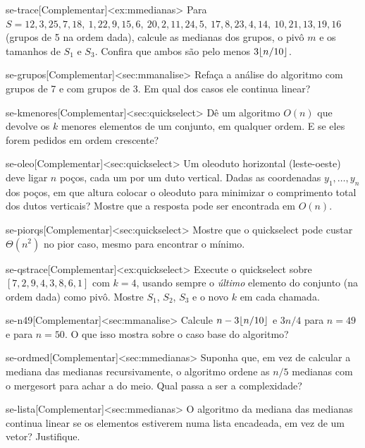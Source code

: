 \excompl
\begin{exercicio}{se-trace}[Complementar]<ex:mmedianas>
Para $S=12,3,25,7,18,\ 1,22,9,15,6,\ 20,2,11,24,5,\ 17,8,23,4,14,\ 10,21,13,19,16$ (grupos de 5 na ordem dada), calcule as medianas dos grupos, o pivô $m$ e os tamanhos de $S_1$ e $S_3$. Confira que ambos são pelo menos $3\lfloor n/10\rfloor$.
\end{exercicio}
\begin{exercicio}{se-grupos}[Complementar]<sec:mmanalise>
Refaça a análise do algoritmo com grupos de 7 e com grupos de 3. Em qual dos casos ele continua linear?
\end{exercicio}
\begin{exercicio}{se-kmenores}[Complementar]<sec:quickselect>
Dê um algoritmo $O(n)$ que devolve os $k$ menores elementos de um conjunto, em qualquer ordem. E se eles forem pedidos em ordem crescente?
\end{exercicio}
\begin{exercicio}{se-oleo}[Complementar]<sec:quickselect>
Um oleoduto horizontal (leste-oeste) deve ligar $n$ poços, cada um por um duto vertical. Dadas as coordenadas $y_1,\dots,y_n$ dos poços, em que altura colocar o oleoduto para minimizar o comprimento total dos dutos verticais? Mostre que a resposta pode ser encontrada em $O(n)$.
\end{exercicio}
\begin{exercicio}{se-piorqs}[Complementar]<sec:quickselect>
Mostre que o quickselect pode custar $\Theta(n^2)$ no pior caso, mesmo para encontrar o mínimo.
\end{exercicio}
\begin{exercicio}{se-qstrace}[Complementar]<ex:quickselect>
Execute o quickselect sobre $[7,2,9,4,3,8,6,1]$ com $k=4$, usando sempre o \emph{último} elemento do conjunto (na ordem dada) como pivô. Mostre $S_1$, $S_2$, $S_3$ e o novo $k$ em cada chamada.
\end{exercicio}
\begin{exercicio}{se-n49}[Complementar]<sec:mmanalise>
Calcule $n-3\lfloor n/10\rfloor$ e $3n/4$ para $n=49$ e para $n=50$. O que isso mostra sobre o caso base do algoritmo?
\end{exercicio}
\begin{exercicio}{se-ordmed}[Complementar]<sec:mmedianas>
Suponha que, em vez de calcular a mediana das medianas recursivamente, o algoritmo ordene as $n/5$ medianas com o mergesort para achar a do meio. Qual passa a ser a complexidade?
\end{exercicio}
\begin{exercicio}{se-lista}[Complementar]<sec:mmedianas>
O algoritmo da mediana das medianas continua linear se os elementos estiverem numa lista encadeada, em vez de um vetor? Justifique.
\end{exercicio}
